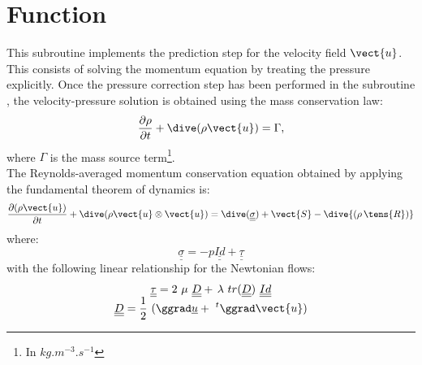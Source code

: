 
%
%
%
%


\label{ap:predvv}
%
\vspace{1cm}
\section*{Function}
This subroutine implements the prediction step for the velocity field $\vect{u}$.
This consists of solving the momentum equation by treating the pressure explicitly.
Once the pressure correction step has been performed in the subroutine ,
the velocity-pressure solution is obtained using the mass conservation law:
\begin{equation}
\frac{\partial \rho } {\partial t}+ \dive(\rho \vect{u}) = \Gamma,
\end{equation}
where $\Gamma$ is the mass source term\footnote{In $kg.m^{-3}.s^{-1}$ }.\\
The Reynolds-averaged momentum conservation equation obtained by applying
the fundamental theorem of dynamics is:
\begin{equation}
\frac {\partial (\rho \vect {u})} {\partial t }+
\dive(\rho \vect{u} \otimes \vect{u}) =
\dive(\underline{\underline{\sigma}}) + \vect{S} - \dive{(\rho\,\tens{R})}\end{equation}
where:
\begin{equation}
\underline{\underline{\sigma}} = - p \underline{\underline{Id}} + \underline{\underline{\tau }}
\end{equation}
with the following linear relationship for the Newtonian flows:
\begin{equation}
\begin{array}{lcl}
&\displaystyle \underline{\underline{\tau}} = 2\ \mu\ \underline{\underline{D}}
+\,
 \lambda\ tr(\underline{\underline{D }})\ \underline{\underline{Id}} &\\
&\displaystyle \underline{\underline{D}}=\frac{1}{2}\ (\ggrad \underline
{u} +\ ^t\ggrad \vect {u})
\end{array}
\end{equation}


